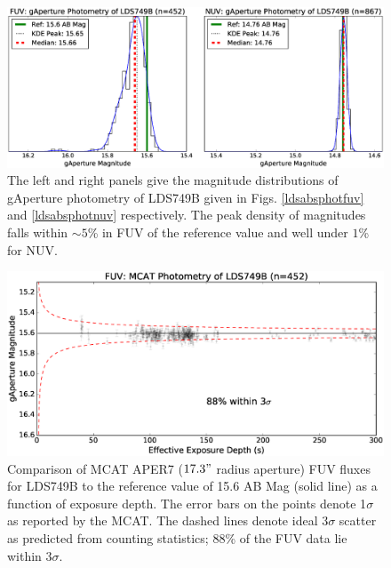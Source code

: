 \documentclass[preprint]{aastex}
\begin{document}
\begin{figure}
\includegraphics[scale=0.55]{Fig11.eps}
\caption{The left and right panels give the magnitude distributions of gAperture photometry of LDS749B given in Figs. \ref{ldsabsphotfuv} and \ref{ldsabsphotnuv} respectively. The peak density of magnitudes falls within $\sim 5$\% in FUV of the reference value and well under $1$\% for NUV.
\label{magdist}}
\end{figure}


\begin{figure}
\includegraphics[scale=0.625]{Fig12.eps}
\caption{Comparison of MCAT APER7 ($17.3"$ radius aperture) FUV fluxes for LDS749B to the reference value of 15.6 AB Mag (solid line) as a function of exposure depth. The error bars on the points denote 1$\sigma$ as reported by the MCAT. The dashed lines denote ideal 3$\sigma$ scatter as predicted from counting statistics; 88\% of the FUV data lie within 3$\sigma$.
\label{ldsabsphotfuvmcat}}
\end{figure}
\end{document}
